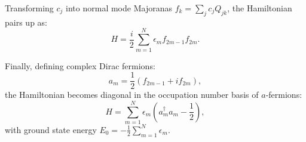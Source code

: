 \documentclass[11pt,a4paper]{article}
\begin{document}
Transforming $c_j$ into normal mode Majoranas $f_k = \sum_j c_j Q_{jk}$, the Hamiltonian pairs up as:
\begin{equation}
    H = \frac{i}{2} \sum_{m=1}^N \epsilon_m f_{2m-1} f_{2m}.
\end{equation}

Finally, defining complex Dirac fermions:
\begin{equation}
    a_m = \frac{1}{2} (f_{2m-1} + i f_{2m}),
\end{equation}
the Hamiltonian becomes diagonal in the occupation number basis of $a$-fermions:
\begin{equation}
    H = \sum_{m=1}^N \epsilon_m \left( a_m^\dagger a_m - \frac{1}{2} \right),
\end{equation}
with ground state energy $E_0 = -\frac{1}{2} \sum_{m=1}^N \epsilon_m$.
\end{document}
